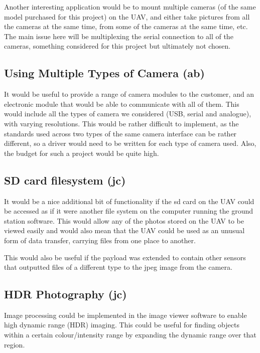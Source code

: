 Another interesting application would be to mount multiple cameras (of the same 
model purchased for this project) on the UAV, and either take pictures from all 
the cameras at the same time, from some of the cameras at the same time, etc. 
The main issue here will be multiplexing the serial connection to all of the 
cameras, something considered for this project but ultimately not chosen.

\subsection{Using Multiple Types of Camera (ab)}

It would be useful to provide a range of camera modules to the customer, and 
an electronic module that would be able to communicate with all of them. This 
would include all the types of camera we considered (USB, serial and analogue), 
with varying resolutions. This would be rather difficult to implement, as the 
standards used across two types of the same camera interface can be rather 
different, so a driver would need to be written for each type of camera used. 
Also, the budget for such a project would be quite high.

\subsection{SD card filesystem (jc)}

It would be a nice additional bit of functionality if the sd card on the UAV could be accessed as if it were another file system on the computer running the ground station software. This would allow any of the photos stored on the UAV to be viewed easily and would also mean that the UAV could be used as an unusual form of data transfer, carrying files from one place to another.

This would also be useful if the payload was extended to contain other sensors that outputted files of a different type to the jpeg image from the camera.

\subsection{HDR Photography (jc)}

Image processing could be implemented in the image viewer software to enable high dynamic range (HDR) imaging. This could be useful for finding objects within a certain colour/intensity range by expanding the dynamic range over that region.

